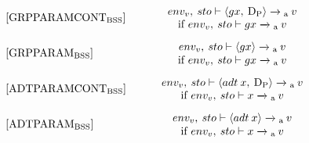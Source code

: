 \begin{equation}
\begin{minipage}{.2\linewidth}
$[\text{GRPPARAMCONT}_\text{BSS}]$
\end{minipage}
\\
\begin{minipage}{.8\linewidth}
\centering
$env_v, \: sto \vdash \langle gx, \: \text{D\textsubscript{P}} \rangle \xrightarrow{}\textsubscript{a} \: v $
\\
if $env_v, \: sto \vdash gx \xrightarrow{} \textsubscript{a} \: v$
\end{minipage}
\end{equation}

\begin{equation}
\begin{minipage}{.2\linewidth}
$[\text{GRPPARAM}_\text{BSS}]$
\end{minipage}
\\
\begin{minipage}{.8\linewidth}
\centering
$env_v, \: sto \vdash \langle gx \rangle \xrightarrow{}\textsubscript{a} \: v $
\\
if $env_v, \: sto \vdash gx \xrightarrow{} \textsubscript{a} \: v$
\end{minipage}
\end{equation}

\begin{equation}
\begin{minipage}{.2\linewidth}
$[\text{ADTPARAMCONT}_\text{BSS}]$
\end{minipage}
\\
\begin{minipage}{.8\linewidth}
\centering
$env_v, \: sto \vdash \langle adt \: x, \: \text{D\textsubscript{P}} \rangle \xrightarrow{}\textsubscript{a} \: v $
\\
if $env_v, \: sto \vdash x \xrightarrow{} \textsubscript{a} \: v$
\end{minipage}
\end{equation}

\begin{equation}
\begin{minipage}{.2\linewidth}
$[\text{ADTPARAM}_\text{BSS}]$
\end{minipage}
\\
\begin{minipage}{.8\linewidth}
\centering
$env_v, \: sto \vdash \langle adt \: x \rangle \xrightarrow{}\textsubscript{a} \: v $
\\
if $env_v, \: sto \vdash x \xrightarrow{} \textsubscript{a} \: v$
\end{minipage}
\end{equation}


